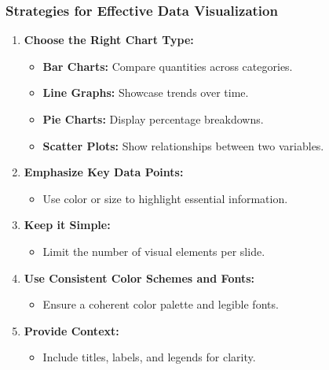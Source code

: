 \documentclass[aspectratio=169]{beamer}
\begin{document}
\begin{frame}[fragile]
  \frametitle{Strategies for Effective Data Visualization}
  \begin{enumerate}
    \item \textbf{Choose the Right Chart Type:}
      \begin{itemize}
        \item \textbf{Bar Charts:} Compare quantities across categories.
        \item \textbf{Line Graphs:} Showcase trends over time.
        \item \textbf{Pie Charts:} Display percentage breakdowns.
        \item \textbf{Scatter Plots:} Show relationships between two variables.
      \end{itemize}
  
    \item \textbf{Emphasize Key Data Points:}
      \begin{itemize}
        \item Use color or size to highlight essential information.
      \end{itemize}
    
    \item \textbf{Keep it Simple:}
      \begin{itemize}
        \item Limit the number of visual elements per slide.
      \end{itemize}
    
    \item \textbf{Use Consistent Color Schemes and Fonts:}
      \begin{itemize}
        \item Ensure a coherent color palette and legible fonts.
      \end{itemize}
    
    \item \textbf{Provide Context:}
      \begin{itemize}
        \item Include titles, labels, and legends for clarity.
      \end{itemize}
  \end{enumerate}
\end{frame}
\end{document}
